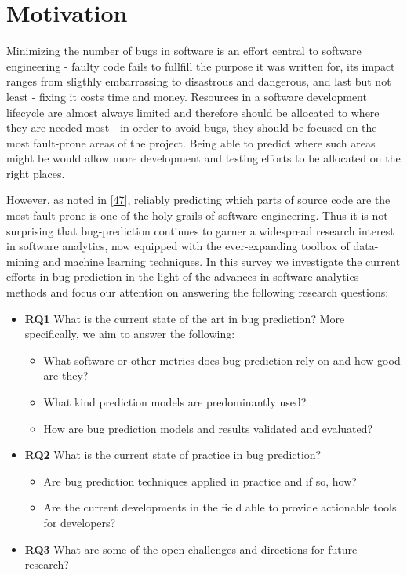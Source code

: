 \documentclass[]{book}
\providecommand{\tightlist}{%
  \setlength{\itemsep}{0pt}\setlength{\parskip}{0pt}}
\begin{document}
\section{Motivation}\label{motivation-2}

Minimizing the number of bugs in software is an effort central to
software engineering - faulty code fails to fullfill the purpose it was
written for, its impact ranges from sligthly embarrassing to disastrous
and dangerous, and last but not least - fixing it costs time and money.
Resources in a software development lifecycle are almost always limited
and therefore should be allocated to where they are needed most - in
order to avoid bugs, they should be focused on the most fault-prone
areas of the project. Being able to predict where such areas might be
would allow more development and testing efforts to be allocated on the
right places.

However, as noted in {[}\protect\hyperlink{ref-DAmbros2012}{47}{]},
reliably predicting which parts of source code are the most fault-prone
is one of the holy-grails of software engineering. Thus it is not
surprising that bug-prediction continues to garner a widespread research
interest in software analytics, now equipped with the ever-expanding
toolbox of data-mining and machine learning techniques. In this survey
we investigate the current efforts in bug-prediction in the light of the
advances in software analytics methods and focus our attention on
answering the following research questions:

\begin{itemize}
\tightlist
\item
  \textbf{RQ1} What is the current state of the art in bug prediction?
  More specifically, we aim to answer the following:

  \begin{itemize}
  \tightlist
  \item
    What software or other metrics does bug prediction rely on and how
    good are they?
  \item
    What kind prediction models are predominantly used?
  \item
    How are bug prediction models and results validated and evaluated?
  \end{itemize}
\item
  \textbf{RQ2} What is the current state of practice in bug prediction?

  \begin{itemize}
  \tightlist
  \item
    Are bug prediction techniques applied in practice and if so, how?
  \item
    Are the current developments in the field able to provide actionable
    tools for developers?
  \end{itemize}
\item
  \textbf{RQ3} What are some of the open challenges and directions for
  future research?
\end{itemize}
\end{document}

